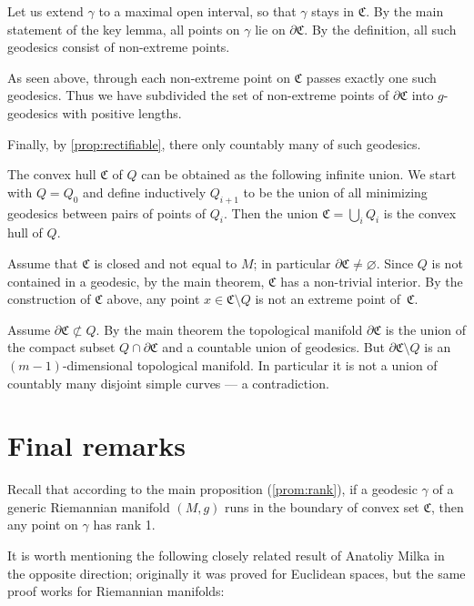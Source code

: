 \documentclass[a4paper,10pt]{article}
\begin{document}
Let us extend $\gamma$ to a maximal open interval, so that $\gamma$ stays in $\mathfrak C$.
By the main statement of the key lemma, all points on $\gamma$ lie on $\partial \mathfrak C$.
By the definition, all such geodesics consist of non-extreme points.

As seen above, through each non-extreme point on $\mathfrak C$ passes exactly one such geodesics.
Thus we have subdivided the set of non-extreme points of $\partial\mathfrak C$ into $g$-geodesics with positive lengths.

Finally, by \ref{prop:rectifiable}, there only countably many of such geodesics.
\qeds

The convex hull $\mathfrak{C}$ of $Q$ can be obtained as the following infinite union.
We start with $Q=Q_0$ and define inductively $Q_{i+1}$ to be the union of all minimizing geodesics between pairs of points of $Q_i$.
Then the union $\mathfrak{C}= \bigcup_{i} 
Q_i$ is the convex hull of $Q$.

Assume that $\mathfrak{C}$ is closed and not equal to $M$; in particular $\partial\mathfrak{C}\ne \varnothing$.
Since $Q$ is not contained in a geodesic, by the main theorem, $\mathfrak{C}$ has a non-trivial interior.
By the construction of $\mathfrak{C}$ above, any point $x\in \mathfrak{C} \setminus Q$ is not an extreme point of~$\mathfrak{C}$.

Assume $\partial \mathfrak{C} \not\subset Q$.
By the main theorem the topological manifold $\partial \mathfrak{C}$ is the union of the compact subset $Q\cap \partial \mathfrak{C}$ and a countable union of geodesics.
But $\partial \mathfrak{C} \setminus Q$ is an $(m-1)$-dimensional topological manifold.
In particular it is not a union of countably many disjoint simple curves --- a contradiction.
\qeds

\section{Final remarks}

Recall that according to the main proposition (\ref{prom:rank}), if a geodesic $\gamma$ of a generic Riemannian manifold $(M,g)$ runs in the boundary of convex set $\mathfrak{C}$, then any point on $\gamma$ has rank 1.

It {\color{red} is worth   mentioning} the following 
	closely  related result of Anatoliy Milka \cite[§~4]{milka} in the opposite direction; originally it was proved for Euclidean spaces, but the same proof works for Riemannian manifolds:
\end{document}
